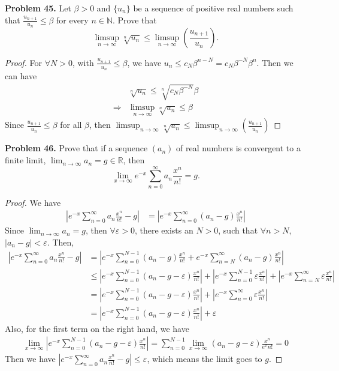 \documentclass[12pt,leqno]{amsart}
\begin{document}
\noindent
{\bf Problem 45.}
Let $\beta>0$ and $\{ u_n\}$ be a sequence of positive real numbers such that $\displaystyle\frac{u_{n+1}}{u_n}\leq\beta$ for every $n\in\mathbb{N}$. Prove that
$$
\limsup_{n\to\infty}\sqrt[n]{u_n}\leq \limsup_{n\to\infty}\left(\frac{u_{n+1}}{u_n}\right).
$$
\begin{proof}
For $\forall N > 0$, with $\frac{u_{n+1}}{u_n}\leq\beta$, we have $u_n \leq c_N \beta^{n-N} = c_N \beta^{-N} \beta^n$. Then we can have 
\begin{align*}
    &\sqrt[n]{u_n} \leq \sqrt[n]{c_N \beta^{-N}}  \beta \\
    \Rightarrow & \limsup_{n\to\infty} \sqrt[n]{u_n} \leq \beta
\end{align*}
Since $\frac{u_{n+1}}{u_n}\leq \beta$ for all $\beta$, then $\limsup_{n\to\infty} \sqrt[n]{u_n} \leq \limsup_{n\to\infty}\left(\frac{u_{n+1}}{u_n}\right)$
\end{proof}

\medskip

\noindent
{\bf Problem 46.}
Prove that if a sequence $(a_n)$ of real numbers is convergent to a finite limit, $\lim_{n\to\infty} a_n=g\in\mathbb{R}$, then
$$
\lim_{x\to\infty} e^{-x}\sum_{n=0}^\infty a_n\frac{x^n}{n!} = g.
$$
\begin{proof}
We have 
\begin{align*}
    \left|e^{-x} \sum^\infty_{n=0} a_n \frac{x^n}{n!} - g \right| & = \left|e^{-x} \sum^\infty_{n=0} (a_n-g) \frac{x^n}{n!}\right|
\end{align*}
Since $\lim_{n\to\infty}a_n=g$, then $\forall \varepsilon > 0$, there exists an $N>0$, such that $\forall n>N$, $|a_n-g|<\varepsilon$. Then, 
\begin{align*}
    \left|e^{-x} \sum^\infty_{n=0} a_n \frac{x^n}{n!} - g \right| & = \left|e^{-x} \sum^{N-1}_{n=0}(a_n-g) \frac{x^n}{n!}+e^{-x} \sum^{\infty}_{n=N}(a_n-g) \frac{x^n}{n!}\right| \\
    & \leq \left|e^{-x} \sum^{N-1}_{n=0}(a_n-g-\varepsilon) \frac{x^n}{n!} \right|+\left|e^{-x} \sum^{N-1}_{n=0}\varepsilon \frac{x^n}{n!} \right|+\left| e^{-x} \sum^{\infty}_{n=N}\varepsilon \frac{x^n}{n!}\right|\\
    & = \left|e^{-x} \sum^{N-1}_{n=0}(a_n-g-\varepsilon) \frac{x^n}{n!} \right|+\left| e^{-x} \sum^{\infty}_{n=0}\varepsilon \frac{x^n}{n!}\right| \\
    & = \left|e^{-x} \sum^{N-1}_{n=0}(a_n-g-\varepsilon) \frac{x^n}{n!} \right|+\varepsilon
\end{align*}
Also, for the first term on the right hand, we have
\begin{align*}
    \lim_{x\to\infty}\left|e^{-x} \sum^{N-1}_{n=0}(a_n-g-\varepsilon) \frac{x^n}{n!} \right| = \sum^{N-1}_{n=0} \lim_{x\to\infty}(a_n-g-\varepsilon) \frac{x^n}{e^x n!}= 0 
\end{align*}
Then we have $\left|e^{-x} \sum^\infty_{n=0} a_n \frac{x^n}{n!} - g \right| \leq \varepsilon$, which means the limit goes to $g$.
\end{proof}
\end{document}
